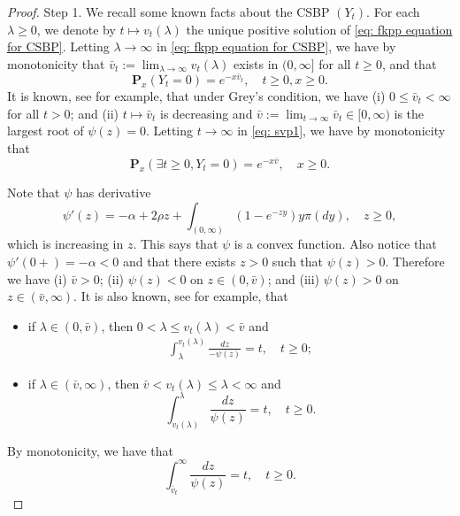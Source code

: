 \documentclass[12pt,a4paper]{amsart}
\theoremstyle{plain}
\theoremstyle{definition}
\numberwithin{equation}{section}
\begin{document}
\begin{proof}
  Step 1. We recall some known facts about the CSBP $(Y_t)$.
  For each $\lambda \geq 0$, we denote by $t\mapsto v_t(\lambda)$ the unique positive solution of \eqref{eq: fkpp equation for CSBP}.
  Letting $\lambda \to \infty$ in \eqref{eq: fkpp equation for CSBP}, we have by monotonicity that $\bar v_t:= \lim_{\lambda \to \infty}v_t(\lambda)$ exists in $(0,\infty]$ for all $t\geq 0$, and that
  \begin{equation}
    \label{eq: svp1}
    \mathbf P_x(Y_t = 0)=e^{-x\bar v_t}, \quad t\geq 0, x\ge 0.
  \end{equation}
  It is known, see \cite[Theorems 3.5--3.8]{Li2011Measure-valued} for example, that under Grey's condition, we have (i) $0\leq \bar v_t < \infty$ for all $t>0$; and (ii) $t\mapsto \bar v_t$ is decreasing and $\bar v:= \lim_{t\to \infty} \bar v_t \in [0,\infty)$ is the largest root of $\psi(z) = 0$.
  Letting $t \to \infty$ in \eqref{eq: svp1}, we have by monotonicity that
  \[
    \mathbf P_x(\exists t \geq 0, Y_t = 0)
    = e^{-x\bar v}, \quad x\geq 0.
  \]

  Note that $\psi$ has derivative
  \[
    \psi'(z)
    = -\alpha + 2\rho z + \int_{(0,\infty)}(1-e^{-zy})y\pi(dy),\quad z\geq 0,
  \]
  which is increasing in $z$.
  This says that $\psi$ is a convex function.
  Also notice that $\psi'(0+)=-\alpha <0$ and that there exists $z>0$ such that $\psi(z)>0$.
  Therefore we have (i) $\bar v > 0$; (ii) $\psi(z) < 0$ on $z\in (0,\bar v)$; and (iii) $\psi(z) > 0 $ on $z\in (\bar v, \infty)$.
  It is also known, see \cite[Proposition 3.3]{Li2011Measure-valued} for example, that
  \begin{itemize}
  \item
    if $\lambda \in (0,\bar v)$, then $0<\lambda \leq v_t(\lambda)<\bar v $ and
    \begin{align}
      \label{CSBP: int}
    \int_{\lambda}^{v_t(\lambda)} \frac{dz}{-\psi(z)} = t, \quad t\geq 0;
    \end{align}
  \item
    if $\lambda \in (\bar v, \infty)$, then $\bar v < v_t(\lambda)\leq \lambda< \infty $ and
    \[
      \int_{v_t(\lambda)}^\lambda\frac{dz}{\psi(z)} = t, \quad t\geq 0.
    \]
  \end{itemize}
  By monotonicity, we have that
  \begin{equation}
    \label{eq:svp2}
    \int_{\bar v_t}^\infty \frac{dz}{\psi(z)} = t, \quad t\geq 0.
  \end{equation}


\end{proof}
\end{document}
